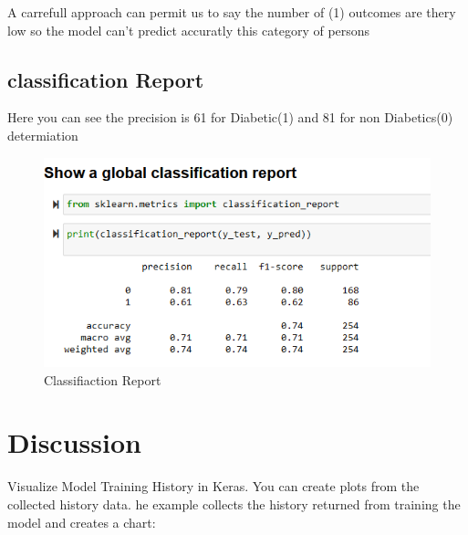     
 A carrefull approach can permit us to say the number of (1) outcomes are thery 
 low so the model can't predict accuratly this category of persons 

 \newpage

 \subsection{classification Report}
 \label{sec:classification Report}

Here you can see the precision is 61 for Diabetic(1) and 81 for non Diabetics(0) determiation
\begin{figure}[htp]
    \centering
    \includegraphics[width=1.2\textwidth]{images/report.png}
    \caption{Classifiaction Report }
    \label{fig:example5}
\end{figure}

\section{Discussion}
\label{chap:discussion}

Visualize Model Training History in Keras.
You can create plots from the collected history data.
he example collects the history returned from training the model and creates a chart:
         
